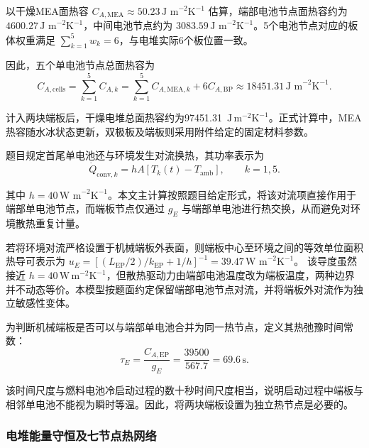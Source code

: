 \documentclass[bwprint]{gmcmthesis}
\numberwithin{equation}{section}
\numberwithin{figure}{section}
\begin{document}
\begin{itemize}
 以干燥MEA面热容 \(C_{A,\text{MEA}} \approx 50.23 \, \text{J m}^{-2}\text{K}^{-1}\) 估算，端部电池节点面热容约为 \(4600.27 \, \text{J m}^{-2}\text{K}^{-1}\)，中间电池节点约为 \(3083.59 \, \text{J m}^{-2}\text{K}^{-1}\)。5个电池节点对应的板体权重满足 \(\sum_{k=1}^5 w_k =6\)，与电堆实际6个板位置一致。

 因此，五个单电池节点总面热容为
\begin{equation}
C_{A,\text{cells}} = \sum_{k=1}^5 C_{A,k} = \sum_{k=1}^5 C_{A,\text{MEA},k} + 6C_{A,\text{BP}} \approx 18451.31 \, \text{J m}^{-2}\text{K}^{-1}. \label{eq:src:5-21}
\end{equation}

 计入两块端板后，干燥电堆总面热容约为97451.31~\(\mathrm{J\,m^{-2}K^{-1}}\)。正式计算中，MEA热容随水冰状态更新，双极板及端板则采用附件给定的固定材料参数。

 题目规定首尾单电池还与环境发生对流换热，其功率表示为
\begin{equation}
\dot{Q}_{\text{conv},k} = hA[T_k(t) - T_{\text{amb}}], \qquad k = 1, 5. \label{eq:src:5-22}
\end{equation}

 其中 \(h = 40 \, \text{W m}^{-2}\text{K}^{-1}\)。本文主计算按照题目给定形式，将该对流项直接作用于端部单电池节点，而端板节点仅通过 \(g_E\) 与端部单电池进行热交换，从而避免对环境散热重复计量。

 若将环境对流严格设置于机械端板外表面，则端板中心至环境之间的等效单位面积热导可表示为
\(u_E = [(L_{\text{EP}}/2)/k_{\text{EP}} + 1/h]^{-1} = 39.47 \, \text{W m}^{-2}\text{K}^{-1}\)。
该导度虽然接近 $h=40\,\mathrm{W\,m^{-2}K^{-1}}$，但散热驱动力由端部电池温度改为端板温度，两种边界并不动态等价。本模型按题面约定保留端部电池节点对流，并将端板外对流作为独立敏感性变体。

 为判断机械端板是否可以与端部单电池合并为同一热节点，定义其热弛豫时间常数：
\begin{equation}
\tau_E = \frac{C_{A,\text{EP}}}{g_E} = \frac{39500}{567.7} = 69.6 \, \text{s}. \label{eq:src:5-23}
\end{equation}

 该时间尺度与燃料电池冷启动过程的数十秒时间尺度相当，说明启动过程中端板与相邻单电池不能视为瞬时等温。因此，将两块端板设置为独立热节点是必要的。



\end{itemize}

\subsubsection{电堆能量守恒及七节点热网络}
\end{document}
